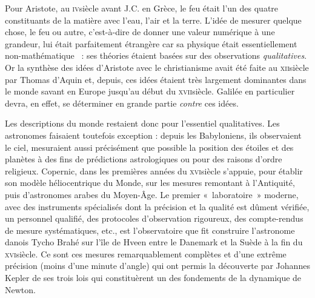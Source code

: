 \atstartofhistorysection
{}
\label{ch_histoire_degre_chaleur_depondt}


	Pour Aristote, au \textsc{iv}\ieme siècle avant J.C. en Grèce, le feu était l'un des quatre constituants de la matière avec l'eau, l'air et la terre. L'idée de mesurer quelque chose, le feu ou autre, c'est-à-dire de donner une valeur numérique à une grandeur, lui était parfaitement étrangère car sa physique était essentiellement non-mathématique~\cite{koyre1966} : ses théories étaient basées sur des observations \emph{qualitatives}. Or la synthèse des idées d'Aristote avec le christianisme avait été faite au \textsc{xii}\ieme siècle par Thomas d'Aquin et, depuis, ces idées étaient très largement dominantes dans le monde savant en Europe jusqu'au début du \textsc{xvii}\ieme siècle. Galilée en particulier devra, en effet, se déterminer en grande partie \emph{contre} ces idées.
	
	Les descriptions du monde restaient donc pour l'essentiel qualitatives. Les astronomes faisaient toutefois exception : depuis les Babyloniens, ils observaient le ciel, mesuraient aussi précisément que possible la position des étoiles et des planètes à des fins de prédictions astrologiques ou pour des raisons d'ordre religieux. Copernic, dans les premières années du \textsc{xvi}\ieme siècle s'appuie, pour établir son modèle héliocentrique du Monde, sur les mesures remontant à l'Antiquité, puis d'astronomes arabes du Moyen-Âge. Le premier «~laboratoire~» moderne, avec des instruments spécialisés dont la précision et la qualité est dûment vérifiée, un personnel qualifié, des protocoles d'observation rigoureux, des compte-rendus de mesure systématiques, etc., est l'observatoire que fit construire l'astronome danois Tycho Brahé sur l'île de Hveen entre le Danemark et la Suède à la fin du \textsc{xvi}\ieme siècle. Ce sont ces mesures remarquablement complètes et d'une extrême précision (moins d'une minute d'angle) qui ont permis la découverte par Johannes Kepler de ses trois lois qui constituèrent un des fondements de la dynamique de Newton.
	
